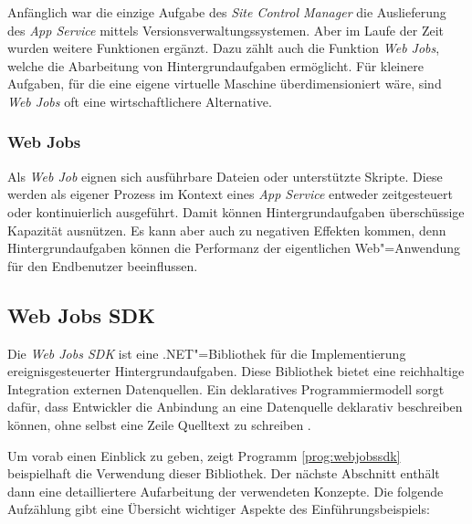 Anfänglich war die einzige Aufgabe des \textit{Site Control Manager} die Auslieferung des \textit{App Service} mittels Versionsverwaltungssystemen. Aber im Laufe der Zeit wurden weitere Funktionen ergänzt. Dazu zählt auch die Funktion \textit{Web Jobs}, welche die Abarbeitung von Hintergrundaufgaben ermöglicht. Für kleinere Aufgaben, für die eine eigene virtuelle Maschine überdimensioniert wäre, sind \textit{Web Jobs} oft eine wirtschaftlichere Alternative.

\subsubsection{Web Jobs}

Als \textit{Web Job} eignen sich ausführbare Dateien oder unterstützte Skripte. Diese werden als eigener Prozess im Kontext eines \textit{App Service} entweder zeitgesteuert oder kontinuierlich ausgeführt. Damit können Hintergrundaufgaben überschüssige Kapazität ausnützen. Es kann aber auch zu negativen Effekten kommen, denn Hintergrundaufgaben können die Performanz der eigentlichen Web"=Anwendung für den Endbenutzer beeinflussen.

\subsection{Web Jobs SDK}
\label{subsec:webjobssdk}

Die \textit{Web Jobs SDK} ist eine .NET"=Bibliothek für die Implementierung ereignisgesteuerter Hintergrundaufgaben. Diese Bibliothek bietet eine reichhaltige Integration externen Datenquellen. Ein deklaratives Programmiermodell sorgt dafür, dass Entwickler die Anbindung an eine Datenquelle deklarativ beschreiben können, ohne selbst eine Zeile Quelltext zu schreiben \cite{WebJobsSdkBindingAttributes}.

Um vorab einen Einblick zu geben, zeigt Programm \ref{prog:webjobssdk} beispielhaft die Verwendung dieser Bibliothek. Der nächste Abschnitt enthält dann eine detailliertere Aufarbeitung der verwendeten Konzepte. Die folgende Aufzählung gibt eine Übersicht wichtiger Aspekte des Einführungsbeispiels:

